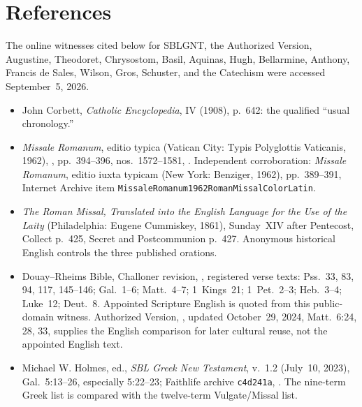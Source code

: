\section*{References}

{\TriptychReferenceFont
{}
\raggedright
The online witnesses cited below for SBLGNT, the Authorized Version,
Augustine, Theodoret, Chrysostom, Basil, Aquinas, Hugh, Bellarmine, Anthony,
Francis de Sales, Wilson, Gros, Schuster, and the Catechism were accessed
September~5, 2026.

\begin{itemize}[leftmargin=1.1em,labelsep=0.35em,itemsep=0.22em,topsep=0.15em,parsep=0pt]
\item John Corbett,  \emph{Catholic Encyclopedia}, IV (1908), p.~642: the qualified ``usual chronology.''
\item \emph{Missale Romanum}, editio typica (Vatican City: Typis Polyglottis
Vaticanis, 1962), ,
pp.~394--396, nos.~1572--1581,
.
Independent corroboration: \emph{Missale Romanum}, editio iuxta typicam
(New York: Benziger, 1962), pp.~389--391, Internet Archive item
\texttt{MissaleRomanum1962\allowbreak RomanMissal\allowbreak ColorLatin}.

\item \emph{The Roman Missal, Translated into the English Language for the Use
of the Laity} (Philadelphia: Eugene Cummiskey, 1861), Sunday~XIV after
Pentecost, Collect p.~425, Secret and Postcommunion p.~427. Anonymous
historical English controls the three published orations.

\item Douay--Rheims Bible, Challoner revision,
,
registered verse texts: Pss.~33, 83, 94, 117, 145--146; Gal.~1--6;
Matt.~4--7; 1~Kings~21; 1~Pet.~2--3; Heb.~3--4; Luke~12; Deut.~8.
Appointed Scripture English is quoted from this public-domain witness.
Authorized Version, , updated October~29, 2024, Matt.~6:24, 28, 33, supplies the English comparison for later
cultural reuse, not the appointed English text.

\item Michael W. Holmes, ed., \emph{SBL Greek New Testament}, v.~1.2
(July~10, 2023), Gal.~5:13--26, especially 5:22--23; Faithlife archive
\texttt{c4d241a}, .
The nine-term Greek list is compared with the twelve-term Vulgate/Missal list.


\end{itemize}}
